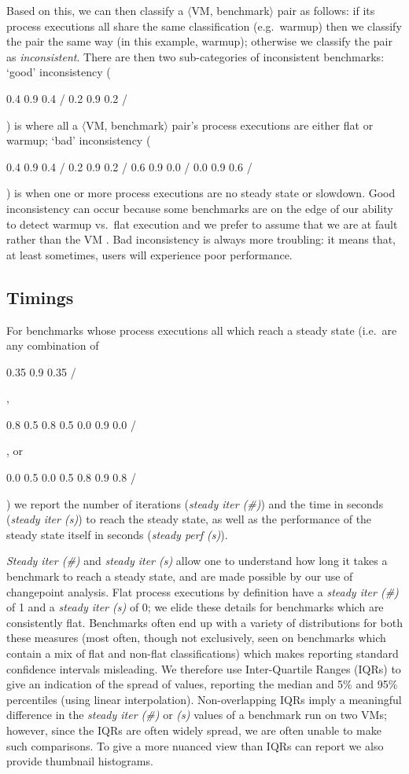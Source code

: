 \documentclass[acmlarge]{acmart}\settopmatter{printfolios=true}
\newcommand{\vmbpair}{$\langle$VM, benchmark$\rangle$\xspace}
\DeclareRobustCommand{\flatc}{%
\setlength{\sparklinethickness}{0.4pt}%
\begin{sparkline}{1.5}
\spark 0.1 0.35
       0.9 0.35
       /%
\end{sparkline}\xspace%
}
\DeclareRobustCommand{\warmup}{%
\setlength{\sparklinethickness}{0.4pt}%
\begin{sparkline}{1.5}
\spark 0.1 0.8
       0.5 0.8
       0.5 0.0
       0.9 0.0
       /%
\end{sparkline}\xspace%
}
\DeclareRobustCommand{\slowdown}{%
\setlength{\sparklinethickness}{0.4pt}%
\begin{sparkline}{1.5}
\spark 0.1 0.0
       0.5 0.0
       0.5 0.8
       0.9 0.8
       /%
\end{sparkline}\xspace%
}
\DeclareRobustCommand{\badinconsistent}{%
\setlength{\sparklinethickness}{0.4pt}%
\begin{sparkline}{1.5}
\spark 0.1 0.4
       0.9 0.4
       /%
\spark 0.1 0.2
       0.9 0.2
       /%
\spark 0.1 0.6
       0.9 0.0
       /%
\spark 0.1 0.0
       0.9 0.6
       /%
\end{sparkline}\xspace%
}
\DeclareRobustCommand{\goodinconsistent}{%
\setlength{\sparklinethickness}{0.4pt}%
\begin{sparkline}{1.5}
\spark 0.1 0.4
       0.9 0.4
       /%
\spark 0.1 0.2
       0.9 0.2
       /%
\end{sparkline}\xspace%
}
\begin{document}
Based on this, we can then classify a \vmbpair pair as follows:
if its process executions all share the same classification (e.g.~warmup) then
we classify the pair the same way (in this example, warmup); otherwise we classify the pair as
\emph{inconsistent}. There are then two sub-categories of inconsistent
benchmarks: `good' inconsistency (\goodinconsistent) is where all a \vmbpair pair's process
executions are either flat or warmup; `bad' inconsistency (\badinconsistent) is
when one or more process executions are no steady state or slowdown. Good inconsistency
can occur because some benchmarks are on the edge of our ability to detect warmup
vs.~flat execution and we prefer to assume that we are at fault rather
than the VM . Bad inconsistency is always more troubling: it
means that, at least sometimes, users will experience poor performance.


\subsection{Timings}

For benchmarks whose process executions all which reach a steady state (i.e.~are
any combination of \flatc, \warmup, or \slowdown) we report the number of
iterations (\emph{steady iter (\#)}) and the time in seconds (\emph{steady iter (s)}) to
reach the steady state, as well as the performance of the steady state itself in
seconds (\emph{steady perf (s)}).

\emph{Steady iter (\#)} and \emph{steady iter (s)} allow one to understand how long it takes
a benchmark to reach a steady state, and are made possible by our use of changepoint
analysis. Flat process executions by definition have a \emph{steady iter (\#)} of 1 and
a \emph{steady iter (s)} of 0; we elide these details for benchmarks
which are consistently flat. Benchmarks often end up with a variety of distributions
for both these measures (most often, though not exclusively, seen on benchmarks
which contain a mix of flat and non-flat classifications) which makes reporting standard confidence intervals
misleading. We therefore use Inter-Quartile Ranges (IQRs) to give an indication of the
spread of values, reporting the median and 5\% and 95\% percentiles (using
linear interpolation). Non-overlapping IQRs imply a meaningful difference in the \emph{steady iter (\#)} or
\emph{(s)} values of a benchmark run on two VMs; however, since the IQRs are often
widely spread, we are often unable to make such comparisons. To give a more
nuanced view than IQRs can report we also provide thumbnail histograms.
\end{document}
